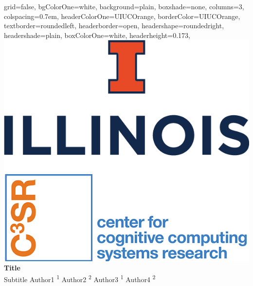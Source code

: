 \documentclass[landscape,paperwidth=182cm,paperheight=120cm, fontscale=0.17]{baposter}
\begin{document}
\begin{poster}{
    grid=false,
    bgColorOne=white,
    background=plain, %
    boxshade=none,
    columns=3,
    colspacing=0.7em,
    headerColorOne=UIUCOrange,
    borderColor=UIUCOrange,
    textborder=roundedleft, %
    headerborder=open,
    headershape=roundedright,
    headershade=plain,
    boxColorOne=white, %
    headerheight=0.173\textheight,
}
{
    \includegraphics[height=0.14\textheight]{templte_figs/logo_combine.png}
}
{
    \sc \huge \textbf{Title} \\
    Subtitle
}
{
    \Large
    \vspace{0.1cm}
    Author1 \textsuperscript{1} \hspace{0.15cm}
    Author2 \textsuperscript{2} \hspace{0.15cm}
    Author3 \textsuperscript{1} \hspace{0.15cm}
    Author4 \textsuperscript{2} \hspace{0.15cm}
}
\end{poster}
\end{document}
